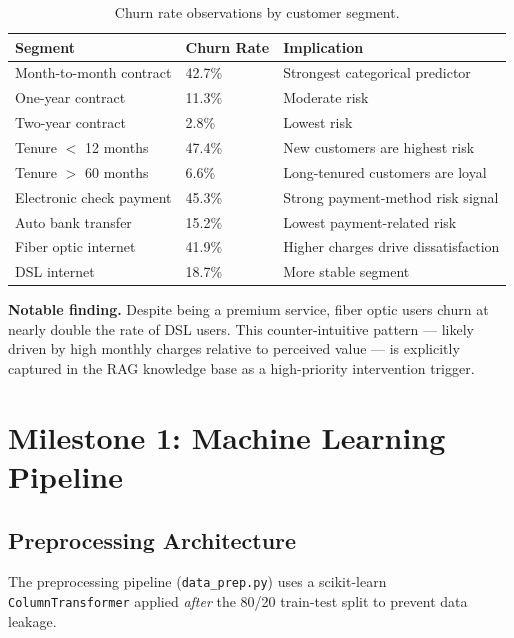 \documentclass[11pt]{article}
\begin{document}
\begin{table}[H]
\centering
\caption{Churn rate observations by customer segment.}
\label{tab:eda}
\renewcommand{\arraystretch}{1.5}
\begin{tabular}{L{5cm} C{3cm} L{5.5cm}}
\toprule
{}
\textbf{Segment} & \textbf{Churn Rate} & \textbf{Implication} \\
\midrule
Month-to-month contract & 42.7\% & Strongest categorical predictor \\
One-year contract       & 11.3\% & Moderate risk \\
Two-year contract       &  2.8\% & Lowest risk \\
\addlinespace[4pt]
Tenure $<$ 12 months    & 47.4\% & New customers are highest risk \\
Tenure $>$ 60 months    &  6.6\% & Long-tenured customers are loyal \\
\addlinespace[4pt]
Electronic check payment & 45.3\% & Strong payment-method risk signal \\
Auto bank transfer       & 15.2\% & Lowest payment-related risk \\
\addlinespace[4pt]
Fiber optic internet     & 41.9\% & Higher charges drive dissatisfaction \\
DSL internet             & 18.7\% & More stable segment \\
\bottomrule
\end{tabular}
\end{table}

\textbf{Notable finding.} Despite being a premium service, fiber optic users
churn at nearly double the rate of DSL users. This counter-intuitive pattern
--- likely driven by high monthly charges relative to perceived value --- is
explicitly captured in the RAG knowledge base as a high-priority intervention
trigger.

\section{Milestone 1: Machine Learning Pipeline}
\label{sec:ml}

\subsection{Preprocessing Architecture}

The preprocessing pipeline (\texttt{data\_prep.py}) uses a scikit-learn
\texttt{ColumnTransformer} applied \emph{after} the 80/20 train-test split
to prevent data leakage.
\end{document}
